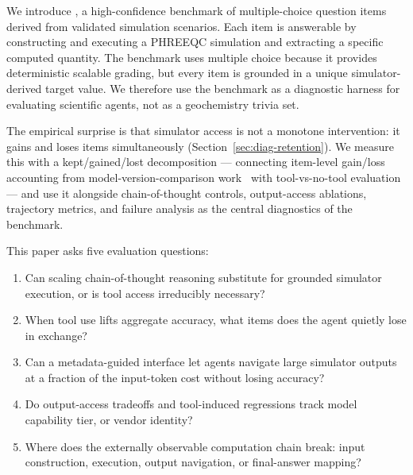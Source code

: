 \documentclass{article}
\begin{document}
We introduce \BenchName, a high-confidence benchmark of \BenchN{} multiple-choice question items derived from \BenchScenarioN{} validated simulation scenarios. Each item is answerable by constructing and executing a PHREEQC simulation and extracting a specific computed quantity. The benchmark uses multiple choice because it provides deterministic scalable grading, but every item is grounded in a unique simulator-derived target value. We therefore use the benchmark as a diagnostic harness for evaluating scientific agents, not as a geochemistry trivia set.

The empirical surprise is that simulator access is not a monotone intervention: it gains and loses items simultaneously (Section~\ref{sec:diag-retention}). We measure this with a kept/gained/lost decomposition --- connecting item-level gain/loss accounting from model-version-comparison work~\citep{rci2026} with tool-vs-no-tool evaluation --- and use it alongside chain-of-thought controls, output-access ablations, trajectory metrics, and failure analysis as the central diagnostics of the benchmark.

This paper asks five evaluation questions:
\begin{enumerate}[leftmargin=*, itemsep=2pt]
    \item Can scaling chain-of-thought reasoning substitute for grounded simulator execution, or is tool access irreducibly necessary?
    \item When tool use lifts aggregate accuracy, what items does the agent quietly lose in exchange?
    \item Can a metadata-guided interface let agents navigate large simulator outputs at a fraction of the input-token cost without losing accuracy?
    \item Do output-access tradeoffs and tool-induced regressions track model capability tier, or vendor identity?
    \item Where does the externally observable computation chain break: input construction, execution, output navigation, or final-answer mapping?
\end{enumerate}
\end{document}
